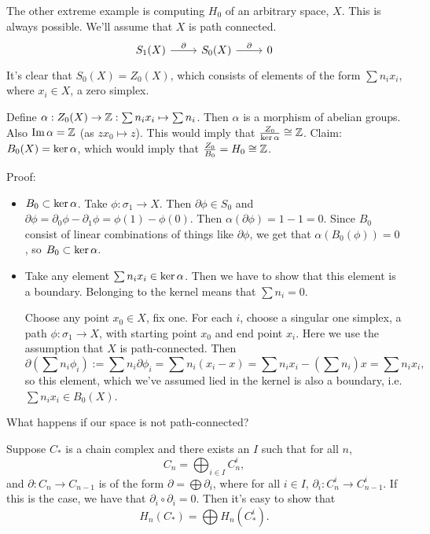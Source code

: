 \begin{eg}
    The other extreme example is computing $H_0$ of an arbitrary space, $X$.
    This is always possible.
    We'll assume that $X$ is path connected.
    \[
        \begin{tikzcd}
            S_1(X) \arrow[r, "\partial"] & S_0(X) \arrow[r, "\partial"] & 0
        \end{tikzcd}
    \]
    It's clear that $S_0(X) = Z_0(X)$, which consists of elements of the form $\sum n_i x_i$, where  $x_i \in X$, a zero simplex.

    Define $\alpha: Z_0(X) \to  \mathbb{Z}: \sum n_i x_i \mapsto \sum n_i$.
    Then $\alpha$ is a morphism of abelian groups.
    Also $\operatorname{Im} \alpha = \mathbb{Z}$ (as $z x_0 \mapsto z$).
    This would imply that $\frac{Z_0}{\operatorname{ker} \alpha} \cong \mathbb{Z}$.
    Claim: $B_0(X) = \operatorname{ker} \alpha$, which would imply that $\frac{Z_0}{B_0} = H_0 \cong \mathbb{Z}$.

    Proof:
    \begin{itemize}
        \item $B_0 \subset \operatorname{ker} \alpha$.
            Take $\phi: \sigma_1 \to  X$.
            Then $\partial \phi \in S_0$ and $\partial\phi = \partial_0\phi - \partial_1\phi = \phi(1) - \phi(0)$.
            Then $\alpha(\partial\phi) = 1 - 1 = 0$. Since $B_0$ consist of linear combinations of things like $\partial \phi$, we get that $\alpha(B_0(\phi)) = 0$, so $B_0\subset  \operatorname{ker} \alpha$.
        \item Take any element $\sum n_i x_i \in \operatorname{ker} \alpha$.
            Then  we have to show that this element is a boundary.
            Belonging to the kernel means that $\sum n_i = 0$.

            Choose any point $x_0 \in X$, fix one.
            For each $i$, choose a singular one simplex, a path $\phi: \sigma_1 \to  X$, with starting point $x_0$ and end point $x_i$.
            Here we use the assumption that $X$ is path-connected.
            Then
            \[
                \partial(\sum n_i \phi_i) := \sum n_i \partial\phi_i = 
                \sum n_i (x_i - x) = \sum n_i x_i - \left(\sum n_i\right) x = \sum n_i x_i
            ,\] 
            so this element, which we've assumed lied in the kernel is also a boundary, i.e. $\sum n_i x_i \in B_0(X)$.
    \end{itemize}
\end{eg}


What happens if our space is not path-connected?

Suppose $C_*$ is a chain complex and there exists an $I$ such that for all $n$, 
\[
C_n = \bigoplus_{i \in I} C_n^{i}
,\] 
and $\partial: C_n \to  C_{n-1}$ is of the form $\partial = \bigoplus \partial_i$,
where for all $i \in I$, $\partial_i: C_n^{i} \to  C_{n-1}^{i}$.
If this is the case, we have that $\partial_i  \circ  \partial_i = 0$.
Then it's easy to show that
\[
    H_n(C_*) = \bigoplus H_n(C_*^{i})
.\] 


